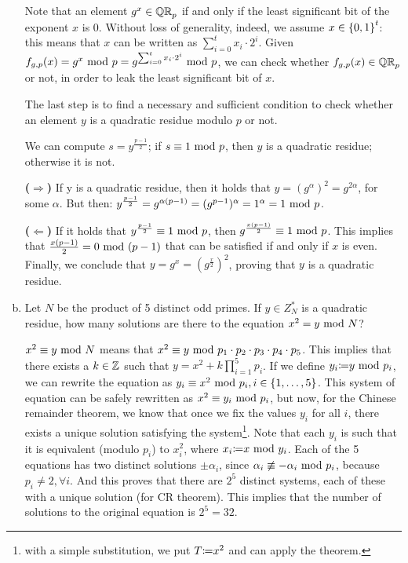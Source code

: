 \begin{enumerate}[(a)]
\begin{solution}
		Note that an element $g^x \in {\mathbb{QR}}_p$ if and only if the least significant bit of the exponent $x$ is $0$. Without loss of generality, indeed, we assume $x \in {\{0, 1\}}^t$: this means that $x$ can be written as $\sum_{i=0}^{t} x_i \cdot 2^i$. Given $f_{g,p}(x) = g^x \mbox{ mod } p = g^{\sum_{i=0}^{t} x_i \cdot 2^i} \mbox{ mod } p$, we can check whether $f_{g,p}(x) \in {\mathbb{QR}}_p$ or not, in order to leak the least significant bit of $x$.

		The last step is to find a necessary and sufficient condition to check whether an element $y$ is a quadratic residue modulo $p$ or not. 

		We can compute $s = y^{\frac{p-1}{2}}$; if $s \equiv 1 \mbox{ mod } p$, then $y$ is a quadratic residue; otherwise it is not.

		\bigskip
		\textbf{($\Rightarrow$)}
		If y is a quadratic residue, then it holds that $y = (g^\alpha)^2 = g^{2\alpha}$, for some $\alpha$. But then: $y^{\frac{p-1}{2}} = g^{\alpha (p-1)} = (g^{p-1})^\alpha = 1^\alpha = 1 \mbox{ mod } p$.

		\bigskip
		\textbf{($\Leftarrow$)}
		If it holds that $y^{\frac{p-1}{2}} \equiv 1 \mbox{ mod } p$, then $g^{\frac{x(p-1)}{2}} \equiv 1 \mbox{ mod } p$. This implies that $\frac{x(p-1)}{2} = 0 \mbox{ mod } (p-1)$ that can be satisfied if and only if $x$ is even. Finally, we conclude that $y = g^x = (g^{\frac{x}{2}})^2$, proving that $y$ is a quadratic residue.

	\end{solution}
	
	\item Let $N$ be the product of 5 distinct odd primes. If $y \in Z^*_N$ is a quadratic residue, how many solutions are there to the equation $x^2 = y \mbox{ mod } N$?
	
	\begin{solution}
		$x^2 \equiv y \mbox{ mod } N$ means that $x^2 \equiv y \mbox{ mod } p_1\cdot p_2\cdot p_3\cdot p_4\cdot p_5$. This implies that there exists a $k \in {\mathbb Z}$ such that $y = x^2 + k\prod_{i=1}^{5}p_i$. If we define $y_i{\coloneqq} y \mbox{ mod } p_i$, we can rewrite the equation as $y_i \equiv x^2 \mbox{ mod } p_i, i \in \{1, \dots, 5\}$. This system of equation can be safely rewritten as $x^2 \equiv y_i \mbox{ mod } p_i$, but now, for the Chinese remainder theorem, we know that once we fix the values $y_i$ for all $i$, there exists a unique solution satisfying the system\footnote{with a simple substitution, we put $T{\coloneqq} x^2$ and can apply the theorem.}. Note that each $y_i$ is such that it is equivalent (modulo $p_i$) to $x_i^2$, where $x_i {\coloneqq} x \mbox{ mod } y_i$. Each of the 5 equations has two distinct solutions $\pm \alpha_i$, since $\alpha_i \not\equiv -\alpha_i \mbox{ mod } p_i$, because $p_i \ne 2, \forall i$. And this proves that there are $2^5$ distinct systems, each of these with a unique solution (for CR theorem). This implies that the number of solutions to the original equation is $2^5 = 32$.
	\end{solution}
\end{enumerate}